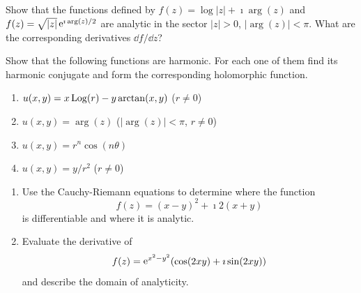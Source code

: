 {\begin{Exercise}
\end{Exercise}




\begin{Exercise}
  \label{exercise log square root}
  Show that the functions defined by $f(z) =
  \log|z| + \imath  \arg(z)$ and $f(z) = \sqrt{|z|} \mathop{\mathrm{e}}\nolimits^{\imath \arg(z)/2}$ are
  analytic in the sector $|z| > 0$, $|\arg(z)| < \pi$. What
  are the corresponding derivatives $\dd f / \dd z$?

\end{Exercise}







\begin{Exercise}
  \label{exercise xlogr yarctanxy}
  Show that the following functions are harmonic.
  For each one of them find its harmonic conjugate and form the
  corresponding holomorphic function.  
  \begin{enumerate}
  \item
    $u(x,y) = x \mathop{\mathrm{Log}}\nolimits(r) - y \arctan(x, y)$ ($r \neq 0$)
  \item
    $u(x,y) = \arg(z)$ ($|\arg(z)| < \pi$, $r \neq 0$)
  \item
    $u(x,y) = r^n \cos(n \theta)$
  \item
    $u(x,y) = y/r^2$ ($r \neq 0$)
  \end{enumerate}

\end{Exercise}






\begin{Exercise}
  \label{exercise cr xy2 i2xy}
  \begin{enumerate}
  \item 
    Use the Cauchy-Riemann equations to determine where the function
    \[
    f(z) = (x - y)^2 + \imath 2 (x + y)
    \]
    is differentiable and where it is analytic.
  \item 
    Evaluate the derivative of
    \[
    f(z) = \mathop{\mathrm{e}}\nolimits^{x^2 - y^2} ( \cos(2 x y) + \imath \sin(2 x y) )
    \]
    and describe the domain of analyticity.
  \end{enumerate}

\end{Exercise}






}
